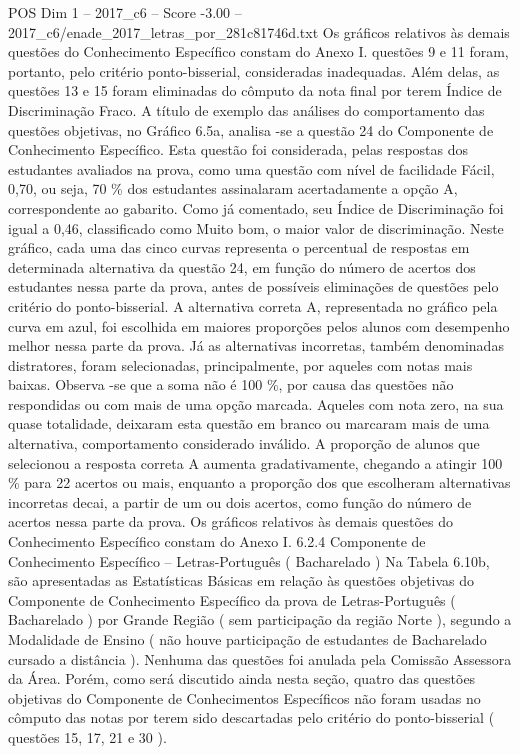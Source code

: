 \begin{textsample}{POS Dim 1 – 2017\_c6 – Score -3.00 – 2017\_c6/enade\_2017\_letras\_por\_281c81746d.txt}
Os gráficos relativos às demais questões do Conhecimento Específico constam do Anexo I. questões 9 e 11 foram, portanto, pelo critério ponto-bisserial, consideradas inadequadas.
Além delas, as questões 13 e 15 foram eliminadas do cômputo da nota final por terem Índice de Discriminação Fraco.
A título de exemplo das análises do comportamento das questões objetivas, no Gráfico 6.5a, analisa -se a questão 24 do Componente de Conhecimento Específico.
Esta questão foi considerada, pelas respostas dos estudantes avaliados na prova, como uma questão com nível de facilidade Fácil, 0,70, ou seja, 70 \% dos estudantes assinalaram acertadamente a opção A, correspondente ao gabarito.
Como já comentado, seu Índice de Discriminação foi igual a 0,46, classificado como Muito bom, o maior valor de discriminação.
Neste gráfico, cada uma das cinco curvas representa o percentual de respostas em determinada alternativa da questão 24, em função do número de acertos dos estudantes nessa parte da prova, antes de possíveis eliminações de questões pelo critério do ponto-bisserial.
A alternativa correta A, representada no gráfico pela curva em azul, foi escolhida em maiores proporções pelos alunos com desempenho melhor nessa parte da prova.
Já as alternativas incorretas, também denominadas distratores, foram selecionadas, principalmente, por aqueles com notas mais baixas.
Observa -se que a soma não é 100 \%, por causa das questões não respondidas ou com mais de uma opção marcada.
Aqueles com nota zero, na sua quase totalidade, deixaram esta questão em branco ou marcaram mais de uma alternativa, comportamento considerado inválido.
A proporção de alunos que selecionou a resposta correta A aumenta gradativamente, chegando a atingir 100 \% para 22 acertos ou mais, enquanto a proporção dos que escolheram alternativas incorretas decai, a partir de um ou dois acertos, como função do número de acertos nessa parte da prova.
Os gráficos relativos às demais questões do Conhecimento Específico constam do Anexo I. 6.2.4 Componente de Conhecimento Específico – Letras-Português ( Bacharelado ) Na Tabela 6.10b, são apresentadas as Estatísticas Básicas em relação às questões objetivas do Componente de Conhecimento Específico da prova de Letras-Português ( Bacharelado ) por Grande Região ( sem participação da região Norte ), segundo a Modalidade de Ensino ( não houve participação de estudantes de Bacharelado cursado a distância ).
Nenhuma das questões foi anulada pela Comissão Assessora da Área.
Porém, como será discutido ainda nesta seção, quatro das questões objetivas do Componente de Conhecimentos Específicos não foram usadas no cômputo das notas por terem sido descartadas pelo critério do ponto-bisserial ( questões 15, 17, 21 e 30 ).

\end{textsample}
